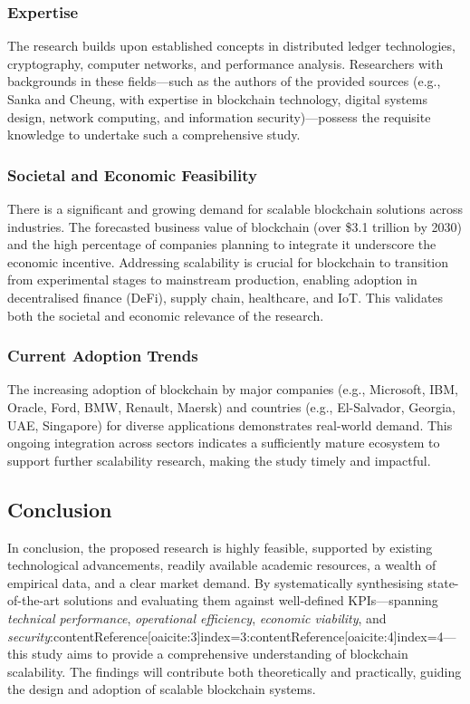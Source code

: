 \subsubsection{Expertise}
The research builds upon established concepts in distributed ledger technologies, cryptography, computer networks, and performance analysis. Researchers with backgrounds in these fields---such as the authors of the provided sources (e.g., Sanka and Cheung, with expertise in blockchain technology, digital systems design, network computing, and information security)---possess the requisite knowledge to undertake such a comprehensive study.

\subsubsection{Societal and Economic Feasibility}
There is a significant and growing demand for scalable blockchain solutions across industries. The forecasted business value of blockchain (over \$3.1 trillion by 2030) and the high percentage of companies planning to integrate it underscore the economic incentive. Addressing scalability is crucial for blockchain to transition from experimental stages to mainstream production, enabling adoption in decentralised finance (DeFi), supply chain, healthcare, and IoT. This validates both the societal and economic relevance of the research.

\subsubsection{Current Adoption Trends}
The increasing adoption of blockchain by major companies (e.g., Microsoft, IBM, Oracle, Ford, BMW, Renault, Maersk) and countries (e.g., El-Salvador, Georgia, UAE, Singapore) for diverse applications demonstrates real-world demand. This ongoing integration across sectors indicates a sufficiently mature ecosystem to support further scalability research, making the study timely and impactful.

\subsection{Conclusion}
In conclusion, the proposed research is highly feasible, supported by existing technological advancements, readily available academic resources, a wealth of empirical data, and a clear market demand. By systematically synthesising state-of-the-art solutions and evaluating them against well-defined KPIs---spanning \textit{technical performance}, \textit{operational efficiency}, \textit{economic viability}, and \textit{security}:contentReference[oaicite:3]{index=3}:contentReference[oaicite:4]{index=4}---this study aims to provide a comprehensive understanding of blockchain scalability. The findings will contribute both theoretically and practically, guiding the design and adoption of scalable blockchain systems.



